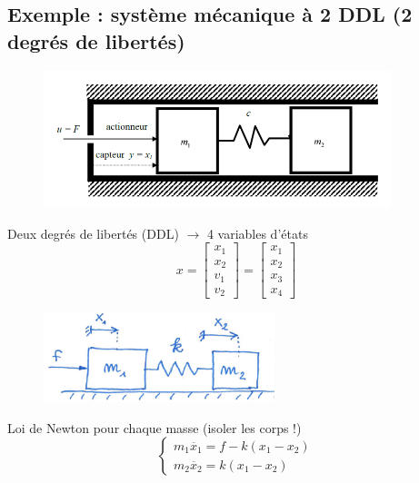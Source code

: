 \documentclass[document.tex]{subfiles}
\begin{document}
\subsection{Exemple : système mécanique à 2 DDL (2 degrés de libertés)}

\begin{figure}[H]
    \centering
    \includegraphics[width=0.9\textwidth]{Include/Figure/18.png}
\end{figure}

Deux degrés de libertés (DDL) $\rightarrow$ 4 variables d'états
\begin{equation}
	x = \begin{bmatrix}
		x_1 \\ x_2 \\ v_1 \\ v_2
	\end{bmatrix} = \begin{bmatrix}
	x_1 \\ x_2 \\ x_3 \\ x_4
	\end{bmatrix}
\end{equation}

\begin{figure}[H]
    \centering
    \includegraphics[width=0.6\textwidth]{Include/Figure/19.png}
\end{figure}

Loi de Newton pour chaque masse (isoler les corps !)\\

\begin{equation}
\begin{cases}
	m_1 \ddot{x_1} = f-k(x_1-x_2) \\
	m_2 \ddot{x_2} = k(x_1-x_2)
\end{cases}
\end{equation}
\end{document}
